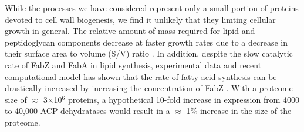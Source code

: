 While the processes we have considered represent only a small portion of
proteins devoted to cell wall biogenesis, we find it unlikely that they limting
cellular growth in general. The relative amount of mass required for lipid and
peptidoglycan components decrease at faster growth rates due to a decrease in
their surface area to volume (S/V) ratio \citep{ojkic2019}. In addition, despite the slow catalytic
rate of FabZ and FabA in lipid synthesis, experimental data and recent
computational model has shown that the rate of fatty-acid synthesis can be
drastically increased by increasing the concentration of FabZ \citep{yu2011,
ruppe2018}. With a proteome size of $\approx$ 3$\times$10$^6$ proteins, a
hypothetical 10-fold increase in expression from 4000 to 40,000 ACP dehydratases
would result in a $\approx$ 1\% increase in the size of the proteome.


%



